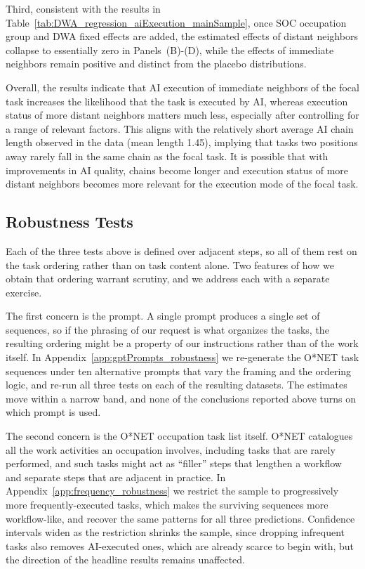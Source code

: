 Third, consistent with the results in Table~\ref{tab:DWA_regression_aiExecution_mainSample}, once SOC occupation group and DWA fixed effects are added, the estimated effects of distant neighbors collapse to essentially zero in Panels~(B)-(D), while the effects of immediate neighbors remain positive and distinct from the placebo distributions.

Overall, the results indicate that AI execution of immediate neighbors of the focal task increases the likelihood that the task is executed by AI, whereas execution status of more distant neighbors matters much less, especially after controlling for a range of relevant factors.
This aligns with the relatively short average AI chain length observed in the data (mean length 1.45), implying that tasks two positions away rarely fall in the same chain as the focal task.
It is possible that with improvements in AI quality, chains become longer and execution status of more distant neighbors becomes more relevant for the execution mode of the focal task.


\subsection{Robustness Tests}
\label{sec:robustness}

Each of the three tests above is defined over adjacent steps, so all of them rest on the task ordering rather than on task content alone.
Two features of how we obtain that ordering warrant scrutiny, and we address each with a separate exercise.

The first concern is the prompt.
A single prompt produces a single set of sequences, so if the phrasing of our request is what organizes the tasks, the resulting ordering might be a property of our instructions rather than of the work itself.
In Appendix~\ref{app:gptPrompts_robustness} we re-generate the O*NET task sequences under ten alternative prompts that vary the framing and the ordering logic, and re-run all three tests on each of the resulting datasets.
The estimates move within a narrow band, and none of the conclusions reported above turns on which prompt is used.

The second concern is the O*NET occupation task list itself.
O*NET catalogues all the work activities an occupation involves, including tasks that are rarely performed, and such tasks might act as ``filler'' steps that lengthen a workflow and separate steps that are adjacent in practice.
In Appendix~\ref{app:frequency_robustness} we restrict the sample to progressively more frequently-executed tasks, which makes the surviving sequences more workflow-like, and recover the same patterns for all three predictions.
Confidence intervals widen as the restriction shrinks the sample, since dropping infrequent tasks also removes AI-executed ones, which are already scarce to begin with, but the direction of the headline results remains unaffected.

